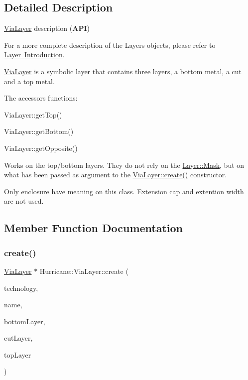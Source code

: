 \subsection{Detailed Description}
\mbox{\hyperlink{classHurricane_1_1ViaLayer}{Via\+Layer}} description ({\bfseries A\+PI}) 

For a more complete description of the Layers objects, please refer to \mbox{\hyperlink{classHurricane_1_1Layer_secLayerIntro}{Layer Introduction}}.

\mbox{\hyperlink{classHurricane_1_1ViaLayer}{Via\+Layer}} is a symbolic layer that contains three layers, a bottom metal, a cut and a top metal.

The accessors functions\+: 
\begin{DoxyItemize}
\item Via\+Layer\+::get\+Top() 
\item Via\+Layer\+::get\+Bottom() 
\item Via\+Layer\+::get\+Opposite() 
\end{DoxyItemize}Works on the top/bottom layers. They do not rely on the \mbox{\hyperlink{classHurricane_1_1Layer_af5277c670637bd5d910237e7afe01a91}{Layer\+::\+Mask}}, but on what has been passed as argument to the \mbox{\hyperlink{classHurricane_1_1ViaLayer_af2a6aa6c3a92fb1427b21662eeed7abd}{Via\+Layer\+::create()}} constructor.

Only enclosure have meaning on this class. Extension cap and extention width are not used. 

\subsection{Member Function Documentation}
\mbox{\label{classHurricane_1_1ViaLayer_af2a6aa6c3a92fb1427b21662eeed7abd}} 
\subsubsection{\texorpdfstring{create()}{create()}}
{\footnotesize\ttfamily \mbox{\hyperlink{classHurricane_1_1ViaLayer}{Via\+Layer}} $\ast$ Hurricane\+::\+Via\+Layer\+::create (\begin{DoxyParamCaption}\item[{\mbox{\hyperlink{classHurricane_1_1Technology}{Technology}} $\ast$}]{technology,  }\item[{const \mbox{\hyperlink{classHurricane_1_1Name}{Name}} \&}]{name,  }\item[{\mbox{\hyperlink{classHurricane_1_1BasicLayer}{Basic\+Layer}} $\ast$}]{bottom\+Layer,  }\item[{\mbox{\hyperlink{classHurricane_1_1BasicLayer}{Basic\+Layer}} $\ast$}]{cut\+Layer,  }\item[{\mbox{\hyperlink{classHurricane_1_1BasicLayer}{Basic\+Layer}} $\ast$}]{top\+Layer }\end{DoxyParamCaption})\hspace{0.3cm}{\ttfamily [static]}}

